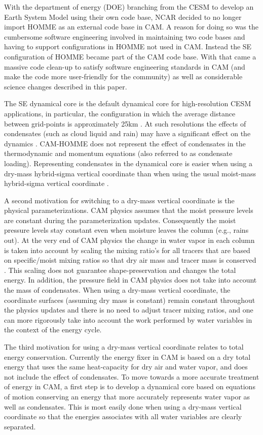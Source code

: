 \documentclass{agujournal}
\begin{document}
{With the department of energy (DOE) branching from the CESM to develop an Earth System Model using their own code base, NCAR decided to no longer import HOMME as an external code base in CAM. A reason for doing so was the cumbersome software engineering involved in maintaining two code bases and having to support configurations in HOMME not used in CAM. Instead the SE configuration of HOMME became part of the CAM code base. With that came a massive code clean-up to satisfy software engineering standards in CAM (and make the code more user-friendly for the community) as well as considerable science changes described in this paper.

The SE dynamical core is the default dynamical core for high-resolution CESM applications, in particular, the configuration in which the average distance between grid-points is approximately 25km \citep{BetAl2013JC}. At such resolutions the effects of condensates (such as cloud liquid and rain) may have a significant effect on the dynamics \citep{BLDT2012GRL}. CAM-HOMME does not represent the effect of condensates in the thermodynamic and momentum equations (also referred to as condensate loading). Representing condensates in the dynamical core is easier when using a dry-mass hybrid-sigma vertical coordinate than when using the usual moist-mass hybrid-sigma vertical coordinate \citep[e.g., ][]{SB1981MWR}.

A second motivation for switching to a dry-mass vertical coordinate is the physical parameterizations. CAM physics assumes that the moist pressure levels are constant during the parameterization updates. Consequently the moist pressure levels stay constant even when moisture leaves the column (e.g., rains out). At the very end of CAM physics the change in water  vapor in each column is taken into account by scaling the mixing ratio's for all tracers that are based on specific/moist mixing ratios so that dry air mass and tracer mass is conserved \citep[see Section 3.1.6 in ][]{CAM5}. This scaling does not guarantee shape-preservation and changes the total energy. In addition, the pressure field in CAM physics does not take into account the mass of condensates. When using a dry-mass vertical coordinate, the coordinate surfaces (assuming dry mass is constant) remain constant throughout the physics updates and there is no need to adjust tracer mixing ratios, and one can more rigorously take into account the work performed by water variables in the context of the energy cycle.

The third motivation for using a dry-mass vertical coordinate relates to total energy conservation. Currently the energy fixer in CAM is based on a dry total energy \citep{WOHTTV2015JAMES} that uses the same heat-capacity for dry air and water vapor, and does not include the effect of condensates. To move towards a more accurate treatment of energy in CAM, a first step is to develop a dynamical core based on equations of motion conserving an energy that more accurately represents water vapor as well as condensates. This is most easily done when using a dry-mass vertical coordinate so that the energies associates with all water variables are clearly separated.

}
\end{document}
